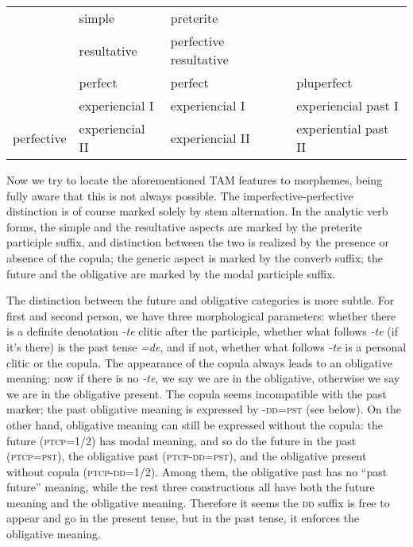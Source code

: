 \documentclass[a4paper, oneside, 12pt]{report}
\newcommand{\form}[1]{\emph{#1}}
\newcommand{\category}[1]{\textsc{#1}}
\begin{document}
\begin{table}[H]
\begin{tabular}{llll}
    \midrule
                                        & simple              & preterite                          & \cellcolor[HTML]{C0C0C0}       \\
                                        & resultative         & perfective resultative             & \cellcolor[HTML]{C0C0C0}       \\
    \cmidrule{2-4} 
                                        & perfect             & perfect                            & pluperfect                     \\
    \cmidrule{2-4} 
                                        & experiencial I      & experiencial I                     & experiencial past I            \\
    \multirow{-5}{*}{perfective}        & experiencial II     & experiencial II                    & experiential past II           \\ 
    \bottomrule
    \end{tabular}
\end{table}

Now we try to locate the aforementioned TAM features to morphemes, 
being fully aware that this is not always possible. 
The imperfective-perfective distinction is of course marked 
solely by stem alternation.
In the analytic verb forms, 
the simple and the resultative aspects
are marked by the preterite participle suffix, 
and distinction between the two is realized by the 
presence or absence of the copula; 
the generic aspect is marked by the converb suffix; 
the future and the obligative are marked by 
the modal participle suffix.

The distinction between the future and obligative categories is more subtle.
For first and second person, 
we have three morphological parameters:
whether there is a definite denotation \form{-te} clitic after the participle, 
whether what follows \form{-te} (if it's there) is 
the past tense \form{=de},
and if not, whether what follows \form{-te} is a personal clitic 
or the copula.
The appearance of the copula always leads to an obligative meaning:
now if there is no \form{-te}, 
we say we are in the obligative, 
otherwise we say we are in the obligative present. 
The copula seems incompatible with the past marker;
the past obligative meaning is expressed by -\category{dd}=\category{pst}
(see below).
On the other hand, obligative meaning can still be expressed 
without the copula:
the future (\category{ptcp}=\category{1/2}) has modal meaning, 
and so do the future in the past (\category{ptcp}=\category{pst}),
the obligative past (\category{ptcp}-\category{dd}=\category{pst}), 
and the obligative present without copula (\category{ptcp}-\category{dd}=\category{1/2}).
Among them, the obligative past has no ``past future'' meaning, 
while the rest three constructions all have both the future meaning 
and the obligative meaning.
Therefore it seems the \category{dd} suffix is free to appear and go 
in the present tense, 
but in the past tense, it enforces the obligative meaning.
\end{document}
